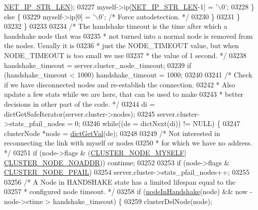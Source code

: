 \begin{DoxyCode}
{{{{{{{{{{{{{{{{{{{{{{{{{{{{{{{{{{{{{{{{{{{{{{{{{{{{{{{{{      \hyperlink{server_8h_ad97c5405ed22a94e9fcc10fba577d6c0}{NET\_IP\_STR\_LEN});
03227                 myself->ip[\hyperlink{server_8h_ad97c5405ed22a94e9fcc10fba577d6c0}{NET\_IP\_STR\_LEN}-1] = \textcolor{stringliteral}{'\(\backslash\)0'};
03228             \} \textcolor{keywordflow}{else} \{
03229                 myself->ip[0] = \textcolor{stringliteral}{'\(\backslash\)0'}; \textcolor{comment}{/* Force autodetection. */}
03230             \}
03231         \}
03232     \}
03233 
03234     \textcolor{comment}{/* The handshake timeout is the time after which a handshake node that was}
03235 \textcolor{comment}{     * not turned into a normal node is removed from the nodes. Usually it is}
03236 \textcolor{comment}{     * just the NODE\_TIMEOUT value, but when NODE\_TIMEOUT is too small we use}
03237 \textcolor{comment}{     * the value of 1 second. */}
03238     handshake\_timeout = server.cluster\_node\_timeout;
03239     \textcolor{keywordflow}{if} (handshake\_timeout < 1000) handshake\_timeout = 1000;
03240 
03241     \textcolor{comment}{/* Check if we have disconnected nodes and re-establish the connection.}
03242 \textcolor{comment}{     * Also update a few stats while we are here, that can be used to make}
03243 \textcolor{comment}{     * better decisions in other part of the code. */}
03244     di = dictGetSafeIterator(server.cluster->nodes);
03245     server.cluster->stats\_pfail\_nodes = 0;
03246     \textcolor{keywordflow}{while}((de = dictNext(di)) != NULL) \{
03247         clusterNode *node = \hyperlink{dict_8h_ae8d2cc391873b2bea2b87c4f80f43120}{dictGetVal}(de);
03248 
03249         \textcolor{comment}{/* Not interested in reconnecting the link with myself or nodes}
03250 \textcolor{comment}{         * for which we have no address. */}
03251         \textcolor{keywordflow}{if} (node->flags & (\hyperlink{cluster_8h_afee946c4e74c08465e9b4ead5e3659e6}{CLUSTER\_NODE\_MYSELF}|
      \hyperlink{cluster_8h_a2bbed8bf0615871a01ca8b7f691b56d8}{CLUSTER\_NODE\_NOADDR})) \textcolor{keywordflow}{continue};
03252 
03253         \textcolor{keywordflow}{if} (node->flags & \hyperlink{cluster_8h_a5306c1ae8988b8be0a1a02bd9162dfa1}{CLUSTER\_NODE\_PFAIL})
03254             server.cluster->stats\_pfail\_nodes++;
03255 
03256         \textcolor{comment}{/* A Node in HANDSHAKE state has a limited lifespan equal to the}
03257 \textcolor{comment}{         * configured node timeout. */}
03258         \textcolor{keywordflow}{if} (\hyperlink{cluster_8h_a70f1a5bb82f54ce5d17b13de42176790}{nodeInHandshake}(node) && now - node->ctime > handshake\_timeout) \{
03259             clusterDelNode(node);
}}}}}}}}}}}}}}}}}}}}}}}}}}}}}}}}}}}}}}}}}}}}}}}}}}}}}}}}}
\end{DoxyCode}
